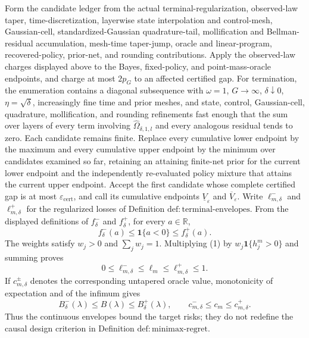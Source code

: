 Form the candidate ledger from the actual terminal-regularization, observed-law taper, time-discretization, layerwise state interpolation and control-mesh, Gaussian-cell, standardized-Gaussian quadrature-tail, mollification and Bellman-residual accumulation, mesh-time taper-jump, oracle and linear-program, recovered-policy, prior-net, and rounding contributions.  Apply the observed-law charges displayed above to the Bayes, fixed-policy, and point-mass-oracle endpoints, and charge at most \(2p_G\) to an affected certified gap.  For termination, the enumeration contains a diagonal subsequence with \(\omega=1\), \(G\to\infty\), \(\delta\downarrow0\), \(\eta=\sqrt\delta\), increasingly fine time and prior meshes, and state, control, Gaussian-cell, quadrature, mollification, and rounding refinements fast enough that the sum over layers of every term involving \(\widehat\Omega_{\delta,1,l}\) and every analogous residual tends to zero.  Each candidate remains finite.  Replace every cumulative lower endpoint by the maximum and every cumulative upper endpoint by the minimum over candidates examined so far, retaining an attaining finite-net prior for the current lower endpoint and the independently re-evaluated policy mixture that attains the current upper endpoint.  Accept the first candidate whose complete certified gap is at most \(\varepsilon_{\mathrm{cert}}\), and call its cumulative endpoints \(\underline V_{\varepsilon}\) and \(\overline V_{\varepsilon}\).
Write \(\ell_{m,\delta}^-\) and \(\ell_{m,\delta}^+\) for the regularized losses of Definition \(\mathrm{def{:}terminal\text{-}envelopes}\).  From the displayed definitions of \(f_\delta^-\) and \(f_\delta^+\), for every \(a\in\mathbb R\),
\[
 f_\delta^-(a)\leq\mathbf 1\{a<0\}\leq f_\delta^+(a).
 \tag{1}
\]
The weights satisfy \(w_j>0\) and \(\sum_jw_j=1\).  Multiplying (1) by \(w_j\mathbf 1\{h_j^m>0\}\) and summing proves
\[
 0\leq\ell_{m,\delta}^-\leq\ell_m\leq
 \ell_{m,\delta}^+\leq1.
 \tag{2}
\]
If \(c_{m,\delta}^\pm\) denotes the corresponding untapered oracle value, monotonicity of expectation and of the infimum gives
\[
 B_\delta^-(\lambda)\leq B(\lambda)\leq B_\delta^+(\lambda),
 \qquad
 c_{m,\delta}^-\leq c_m\leq c_{m,\delta}^+.
 \tag{3}
\]
Thus the continuous envelopes bound the target risks; they do not redefine the causal design criterion in Definition \(\mathrm{def{:}minimax\text{-}regret}\).

